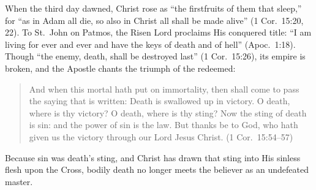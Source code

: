 When the third day dawned, Christ rose as ``the firstfruits of them that sleep,'' for ``as in Adam all die, so also in Christ all shall be made alive'' (1 Cor.\ 15:20, 22). To St.~John on Patmos, the Risen Lord proclaims His conquered title: ``I am living for ever and ever and have the keys of death and of hell'' (Apoc.\ 1:18). Though ``the enemy, death, shall be destroyed last'' (1 Cor.\ 15:26), its empire is broken, and the Apostle chants the triumph of the redeemed:

\begin{quote}
And when this mortal hath put on immortality, then shall come to pass the saying that is written: Death is swallowed up in victory. O death, where is thy victory? O death, where is thy sting? Now the sting of death is sin: and the power of sin is the law. But thanks be to God, who hath given us the victory through our Lord Jesus Christ. (1 Cor.\ 15:54--57)
\end{quote}

Because sin was death's sting, and Christ has drawn that sting into His sinless flesh upon the Cross, bodily death no longer meets the believer as an undefeated master.
